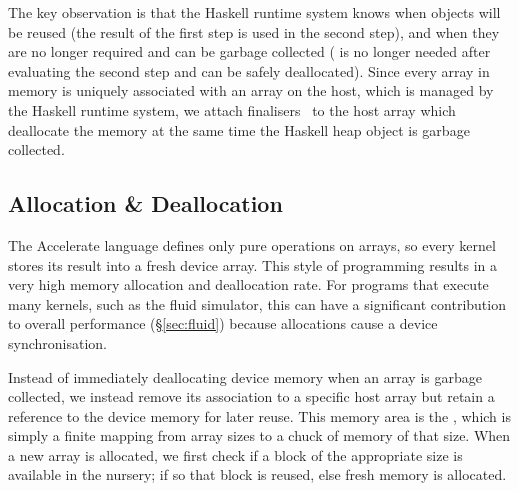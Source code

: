 The key observation is that the Haskell runtime system knows when objects will
be reused (the result of the first step  is used in the second step),
and when they are no longer required and can be garbage collected ( is
no longer needed after evaluating the second step and can be safely
deallocated). Since every array in \GPU memory is uniquely associated with an
array on the host, which is managed by the Haskell runtime system, we attach
finalisers~\cite{PeytonJones:2000ks} to the host array which deallocate the
\GPU memory at the same time the Haskell heap object is garbage collected.

% 


\subsection{Allocation \& Deallocation}

The Accelerate language defines only pure operations on arrays, so every kernel
stores its result into a fresh device array. This style of programming results
in a very high memory allocation and deallocation rate. For programs that
execute many kernels, such as the fluid simulator, this can have a
significant contribution to overall performance (\S\ref{sec:fluid}) because
allocations cause a device synchronisation.

Instead of immediately deallocating device memory when an array is garbage
collected, we instead remove its association to a specific host array but retain
a reference to the device memory for later reuse. This memory area is the
, which is simply a finite mapping from array sizes to a chuck
of memory of that size. When a new array is allocated, we first check if a block
of the appropriate size is available in the nursery; if so that block is reused,
else fresh memory is allocated.

% 

